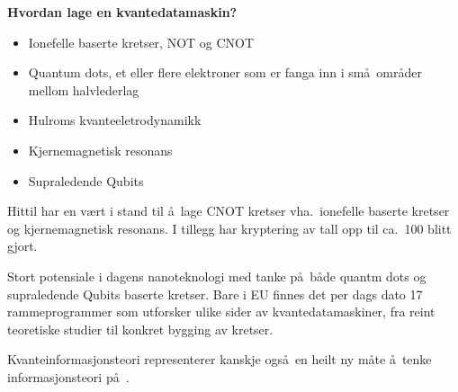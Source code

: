 \Large
\begin{center}
   \begin{minipage}{0.8\textwidth}
       \vspace*{0.5cm}
       \begin{center}
            { \LARGE \bf Hvordan lage en kvantedatamaskin?}
       \end{center}
\begin{itemize}
 \item Ionefelle baserte kretser, NOT og CNOT
 \item Quantum dots, et eller flere elektroner som er fanga inn i sm\aa\
       omr\aa der mellom halvlederlag
 \item Hulroms kvanteeletrodynamikk
 \item Kjernemagnetisk resonans
 \item Supraledende Qubits
\end{itemize}

Hittil har en v\ae rt i stand til \aa\ lage CNOT kretser vha.~ionefelle
baserte kretser og kjernemagnetisk resonans. I tillegg har kryptering
av tall opp til ca.~100 blitt gjort. 

Stort potensiale i dagens nanoteknologi med tanke p\aa\ b\aa de
quantm dots og supraledende Qubits baserte kretser. Bare i EU finnes
det per dags dato 17 rammeprogrammer som utforsker ulike sider
av kvantedatamaskiner, fra reint teoretiske studier til konkret bygging
av kretser.

Kvanteinformasjonsteori representerer kanskje ogs\aa\ en heilt ny m\aa te
\aa\ tenke informasjonsteori p\aa\ . 
\end{minipage}
\end{center}











